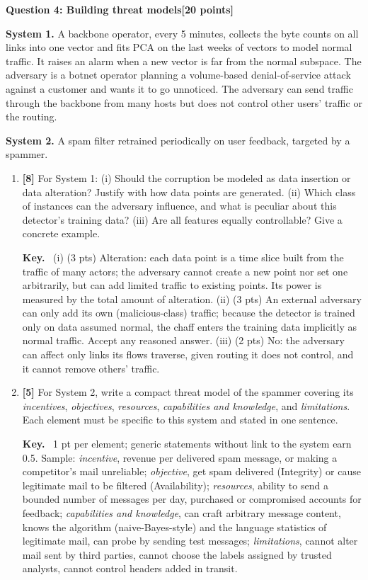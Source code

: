 \documentclass[10pt,a4paper]{extarticle}
\newcommand{\question}[3]{%
  \bigskip
  \begin{tcolorbox}[colback=navy!6, colframe=navy, boxrule=0.6pt, arc=1pt,
                    left=5pt, right=5pt, top=2pt, bottom=2pt]
    \textbf{\color{navy}Question #1: #2}\hfill\textbf{\color{accent}[#3 points]}
  \end{tcolorbox}\nopagebreak[4]}
\newcommand{\pts}[1]{\textbf{\color{accent}[#1]}\enspace}
\newenvironment{sol}{\par\smallskip
    \begin{tcolorbox}[colback=accent!6, colframe=accent, boxrule=0.5pt, arc=1pt,
                      left=5pt, right=5pt, top=2pt, bottom=2pt, breakable, fontupper=\small]
    \textbf{\color{accent}Key.}\ }{\end{tcolorbox}\par}
\begin{document}
\question{4}{Building threat models}{20}

\textbf{System 1.} A backbone operator, every 5 minutes, collects the byte counts on all links into one vector and fits PCA on the last weeks of vectors to model normal traffic. It raises an alarm when a new vector is far from the normal subspace. The adversary is a botnet operator planning a volume-based denial-of-service attack against a customer and wants it to go unnoticed. The adversary can send traffic through the backbone from many hosts but does not control other users' traffic or the routing.

\textbf{System 2.} A spam filter retrained periodically on user feedback, targeted by a spammer.

\begin{enumerate}[label=(\alph*)]
\item \pts{8} For System 1: (i) Should the corruption be modeled as data insertion or data alteration? Justify with how data points are generated. (ii) Which class of instances can the adversary influence, and what is peculiar about this detector's training data? (iii) Are all features equally controllable? Give a concrete example.

\begin{sol}
(i) (3 pts) Alteration: each data point is a time slice built from the traffic of many actors; the adversary cannot create a new point nor set one arbitrarily, but can add limited traffic to existing points. Its power is measured by the total amount of alteration. (ii) (3 pts) An external adversary can only add its own (malicious-class) traffic; because the detector is trained only on data assumed normal, the chaff enters the training data implicitly as normal traffic. Accept any reasoned answer. (iii) (2 pts) No: the adversary can affect only links its flows traverse, given routing it does not control, and it cannot remove others' traffic.
\end{sol}

\item \pts{5} For System 2, write a compact threat model of the spammer covering its \emph{incentives}, \emph{objectives}, \emph{resources}, \emph{capabilities and knowledge}, and \emph{limitations}. Each element must be specific to this system and stated in one sentence.

\begin{sol}
1 pt per element; generic statements without link to the system earn 0.5. Sample: \emph{incentive}, revenue per delivered spam message, or making a competitor's mail unreliable; \emph{objective}, get spam delivered (Integrity) or cause legitimate mail to be filtered (Availability); \emph{resources}, ability to send a bounded number of messages per day, purchased or compromised accounts for feedback; \emph{capabilities and knowledge}, can craft arbitrary message content, knows the algorithm (naive-Bayes-style) and the language statistics of legitimate mail, can probe by sending test messages; \emph{limitations}, cannot alter mail sent by third parties, cannot choose the labels assigned by trusted analysts, cannot control headers added in transit.
\end{sol}


\end{enumerate}
\end{document}
